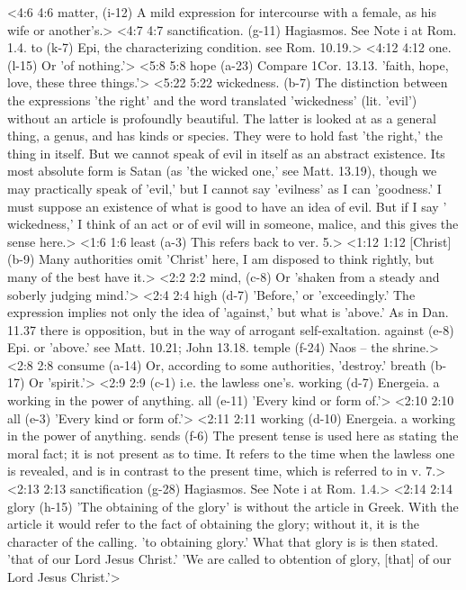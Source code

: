 <4:6 4:6  matter, (i-12)  A mild expression for intercourse with a female, as his wife  or another's.>
<4:7 4:7  sanctification. (g-11)  Hagiasmos. See Note i at Rom. 1.4.
  to (k-7)  Epi, the characterizing condition. see Rom. 10.19.>
<4:12 4:12  one. (l-15)  Or 'of nothing.'>
<5:8 5:8  hope (a-23)  Compare 1Cor. 13.13. 'faith, hope, love, these three things.'>
<5:22 5:22  wickedness. (b-7)  The distinction between the expressions 'the right' and the  word translated 'wickedness' (lit. 'evil') without an article  is profoundly beautiful. The latter is looked at as a general  thing, a genus, and has kinds or species. They were to hold  fast 'the right,' the thing in itself. But we cannot speak of  evil in itself as an abstract existence. Its most absolute form  is Satan (as 'the wicked one,' see Matt. 13.19), though we may  practically speak of 'evil,' but I cannot say 'evilness' as I  can 'goodness.' I must suppose an existence of what is good to  have an idea of evil. But if I say ' wickedness,' I think of an  act or of evil will in someone, malice, and this gives the  sense here.>
<1:6 1:6  least (a-3)  This refers back to ver. 5.>
<1:12 1:12  [Christ] (b-9)  Many authorities omit 'Christ' here, I am disposed to think  rightly, but many of the best have it.>
<2:2 2:2  mind, (c-8)  Or 'shaken from a steady and soberly judging mind.'>
<2:4 2:4  high (d-7)  'Before,' or 'exceedingly.' The expression implies not only  the idea of 'against,' but what is 'above.' As in Dan. 11.37  there is opposition, but in the way of arrogant  self-exaltation.
  against (e-8)  Epi. or 'above.' see Matt. 10.21; John 13.18.
  temple (f-24)  Naos -- the shrine.>
<2:8 2:8  consume (a-14)  Or, according to some authorities, 'destroy.'
  breath (b-17)  Or 'spirit.'>
<2:9 2:9   (c-1)  i.e. the lawless one's.
  working (d-7)  Energeia. a working in the power of anything.
  all (e-11) 'Every kind or form of.'>
<2:10 2:10  all (e-3)  'Every kind or form of.'>
<2:11 2:11  working (d-10)  Energeia. a working in the power of anything.
  sends (f-6)  The present tense is used here as stating the moral fact; it  is not present as to time. It refers to the time when the  lawless one is revealed, and is in contrast to the present  time, which is referred to in v. 7.>
<2:13 2:13  sanctification (g-28)  Hagiasmos. See Note i at Rom. 1.4.>
<2:14 2:14  glory (h-15)  'The obtaining of the glory' is without the article in Greek.  With the article it would refer to the fact of obtaining the  glory; without it, it is the character of the calling. 'to  obtaining glory.' What that glory is is then stated. 'that of  our Lord Jesus Christ.' 'We are called to obtention of glory,  [that] of our Lord Jesus Christ.'>
